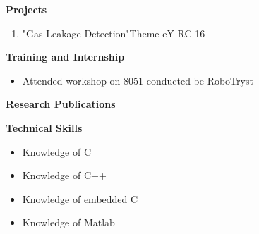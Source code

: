 \documentclass{article}
\begin{document}
\begin{flushleft}
\textbf{Projects }
\begin{flushright}
\begin{enumerate}
\item "Gas Leakage Detection"Theme eY-RC 16
\end{enumerate} 
\end{flushright}
\end{flushleft}



\begin{flushleft}
\textbf{Training and Internship}
\begin{flushright}
\begin{itemize}
\item Attended workshop on 8051 conducted be RoboTryst
\end{itemize} 
\end{flushright}
\end{flushleft}


\begin{flushleft}
\textbf{Research Publications }
\end{flushleft}



\begin{flushleft}
\textbf{Technical Skills}
\begin{flushright}
\begin{itemize}
\item Knowledge of C
\item Knowledge of C++
\item Knowledge of embedded C
\item Knowledge of Matlab
\end{itemize} 
\end{flushright}
\end{flushleft}
\end{document}
